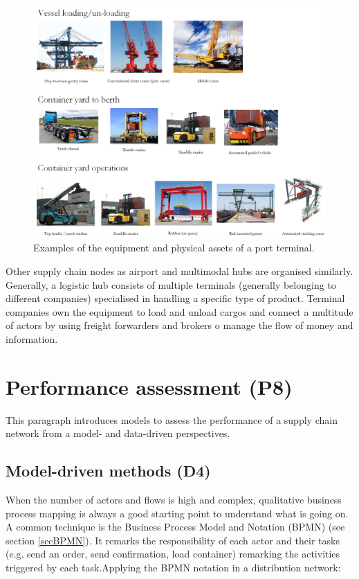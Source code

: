 \begin{figure}[hbt!]
\centering
\includegraphics[width=1.0\textwidth]{SectionDistribution/control_figures/fig_terminalInfrastructure.png}
\captionsetup{type=figure}
\caption{Examples of the equipment and physical assets of a port terminal.}
\label{fig_terminalInfrastructure}
\end{figure}

Other supply chain nodes as airport and multimodal hubs are organised similarly. Generally, a logistic hub consists of multiple terminals (generally belonging to different companies) specialised in handling a specific type of product. Terminal companies own the equipment to load and unload cargos and connect a multitude of actors by using freight forwarders and brokers o manage the flow of money and information.

\section{Performance assessment (P8)}

This paragraph introduces models to assess the performance of a supply chain network from a model- and data-driven perspectives.

\subsection{Model-driven methods (D4)}
When the number of actors and flows is high and complex, qualitative business process mapping is always a good starting point to understand what is going on. A common technique is the Business Process Model and Notation (BPMN) (see section \ref{secBPMN}). It remarks the responsibility of each actor and their tasks (e.g. send an order, send confirmation, load container) remarking the activities triggered by each task.Applying the BPMN notation in a distribution network:

